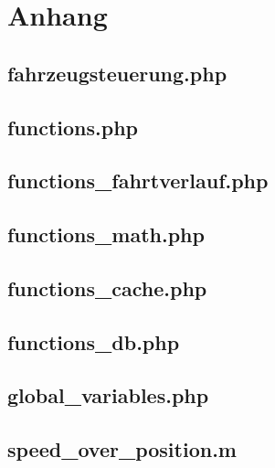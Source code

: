 \section{Anhang}

\subsection{fahrzeugsteuerung.php} \label{anhangMain}



\newpage

\subsection{functions.php} \label{sortFunctions}



\newpage

\subsection{functions\_fahrtverlauf.php} \label{fahrtverlaufFunctions}



\newpage

\subsection{functions\_math.php} \label{functionsMath}



\newpage

\subsection{functions\_cache.php} \label{cacheFunctionsOwn}



\newpage

\subsection{functions\_db.php} \label{functionsDatabase}



\newpage

\subsection{global\_variables.php} \label{anhangGlobalVariables}



\newpage

\subsection{speed\_over\_position.m} \label{anhangMatlab}


